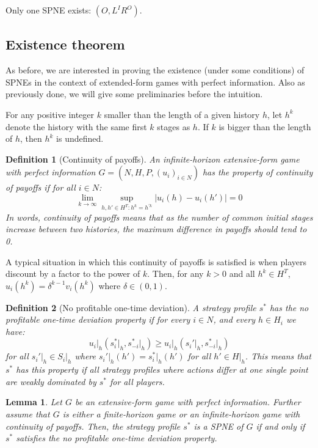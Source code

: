 \documentclass[12pt]{report}
\newtheorem{definition}{Definition}[chapter]
\newtheorem{lemma}{Lemma}[chapter]
\begin{document}
Only one SPNE exists: $(O, L^IR^O)$.

\subsection{Existence theorem}

As before, we are interested in proving the existence (under some conditions) of SPNEs in the context of extended-form games with perfect information. Also as previously done, we will give some preliminaries before the intuition.

For any positive integer $k$ smaller than the length of a given history $h$, let $h^k$ denote the history with the same first $k$ stages as $h$. If $k$ is bigger than the length of $h$, then $h^k$ is undefined.

\begin{definition}[Continuity of payoffs]
An infinite-horizon extensive-form game with perfect information $G = (N, H, P, (u_i)_{i\in N} )$ has the property of continuity of payoffs if for all $i\in N$: $$\lim_{k\to\infty} \sup_{h, h'\in H^T : h^k = h^{'k}} \vert u_i(h) - u_i(h')\vert = 0 $$ In words, continuity of payoffs means that as the number of common initial stages increase between two histories, the maximum difference in payoffs should tend to 0. 
\end{definition}

A typical situation in which this continuity of payoffs is satisfied is when players discount by a factor to the power of $k$. Then, for any $k>0$ and all $h^k\in H^T$, $u_i(h^k) = \delta^{k-1} v_i(h^k)$ where $\delta\in (0,1)$.

\begin{definition}[No profitable one-time deviation]
A strategy profile $s^*$ has the no profitable one-time deviation property if for every $i\in N$, and every $h\in H_i$ we have: $$u_i\vert_h (s_i^*\vert_h, s_{-i}^*\vert_h) \geq u_i\vert_h (s_i'\vert_h, s_{-i}^*\vert_h) $$ for all $s_i'\vert_h \in S_i\vert_h$ where $s_i'\vert_h(h') = s_i^*\vert_h(h')$ for all $h'\in H\vert_h$. This means that $s^*$ has this property if all strategy profiles where actions differ at one single point are weakly dominated by $s^*$ for all players.
\end{definition}

\begin{lemma}
Let $G$ be an extensive-form game with perfect information. Further assume that $G$ is either a finite-horizon game or an infinite-horizon game with continuity of payoffs. Then, the strategy profile $s^*$ is a SPNE of $G$ if and only if $s^*$ satisfies the no profitable one-time deviation property.
\end{lemma}
\end{document}
